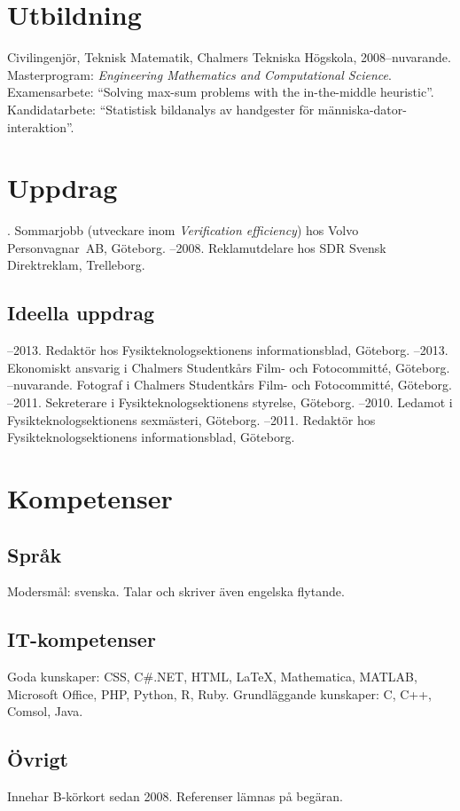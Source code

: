 \documentclass{skvitae}
\author{Simon Sigurdhsson}
\affiliation{}
\begin{document}
	\maketitle

	\section{Utbildning}
	\ind Civilingenjör, Teknisk Matematik, Chalmers Tekniska Högskola, 2008--nuvarande.\\Masterprogram: \emph{Engineering Mathematics and Computational Science}.\\Examensarbete: \foreignquote{english}{Solving max-sum problems with the in-the-middle heuristic}.\\Kandidatarbete: \enquote{Statistisk bildanalys av handgester för människa-dator-interaktion}.

	\section{Uppdrag}
	. Sommarjobb (utveckare inom \emph{Verification efficiency}) hos Volvo Person\-vagnar~AB, Göteborg.
	--2008. Reklamutdelare hos SDR Svensk Direktreklam, Trelleborg.

	\medskip
	\subsection{Ideella uppdrag}
	--2013. Redaktör hos Fysikteknologsektionens informationsblad, Göteborg.
	--2013. Ekonomiskt ansvarig i Chalmers Studentkårs Film- och Fotocommitté, Göteborg.
	--nuvarande. Fotograf i Chalmers Studentkårs Film- och Fotocommitté, Göteborg.
	--2011. Sekreterare i Fysikteknologsektionens styrelse, Göteborg.
	--2010. Ledamot i Fysikteknologsektionens sexmästeri, Göteborg.
	--2011. Redaktör hos Fysikteknologsektionens informationsblad, Göteborg.

	\section{Kompetenser}
	\subsection{Språk}
	\ind Modersmål: svenska. Talar och skriver även engelska flytande.

	\medskip
	\subsection{IT-kompetenser}
	\ind Goda kunskaper: CSS, C\#.NET, HTML, \LaTeX, Mathematica, MATLAB, Microsoft Office, PHP, Python, R, Ruby.
	\ind Grundläggande kunskaper: C, C++, Comsol, Java.

	\medskip
	\subsection{Övrigt}
	\ind Innehar B-körkort sedan 2008.
	\ind Referenser lämnas på begäran.
\end{document}
